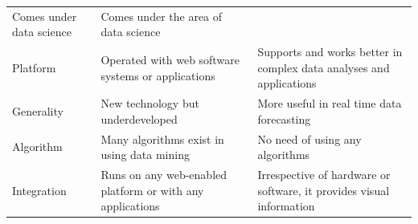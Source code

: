 \documentclass[]{book}
\theoremstyle{definition}
\theoremstyle{definition}
\theoremstyle{definition}
\theoremstyle{remark}
\begin{document}
\begin{longtable}[]{@{}lll@{}}
\begin{minipage}[t]{0.41\columnwidth}
Comes under data science\strut
\end{minipage} & \begin{minipage}[t]{0.41\columnwidth}\raggedright\strut
Comes under the area of data science\strut
\end{minipage}\tabularnewline
\begin{minipage}[t]{0.08\columnwidth}\raggedright\strut
Platform\strut
\end{minipage} & \begin{minipage}[t]{0.41\columnwidth}\raggedright\strut
Operated with web software systems or applications\strut
\end{minipage} & \begin{minipage}[t]{0.41\columnwidth}\raggedright\strut
Supports and works better in complex data analyses and
applications\strut
\end{minipage}\tabularnewline
\begin{minipage}[t]{0.08\columnwidth}\raggedright\strut
Generality\strut
\end{minipage} & \begin{minipage}[t]{0.41\columnwidth}\raggedright\strut
New technology but underdeveloped\strut
\end{minipage} & \begin{minipage}[t]{0.41\columnwidth}\raggedright\strut
More useful in real time data forecasting\strut
\end{minipage}\tabularnewline
\begin{minipage}[t]{0.08\columnwidth}\raggedright\strut
Algorithm\strut
\end{minipage} & \begin{minipage}[t]{0.41\columnwidth}\raggedright\strut
Many algorithms exist in using data mining\strut
\end{minipage} & \begin{minipage}[t]{0.41\columnwidth}\raggedright\strut
No need of using any algorithms\strut
\end{minipage}\tabularnewline
\begin{minipage}[t]{0.08\columnwidth}\raggedright\strut
Integration\strut
\end{minipage} & \begin{minipage}[t]{0.41\columnwidth}\raggedright\strut
Runs on any web-enabled platform or with any applications\strut
\end{minipage} & \begin{minipage}[t]{0.41\columnwidth}\raggedright\strut
Irrespective of hardware or software, it provides visual
information\strut
\end{minipage}\tabularnewline
\bottomrule
\end{longtable}
\end{document}

